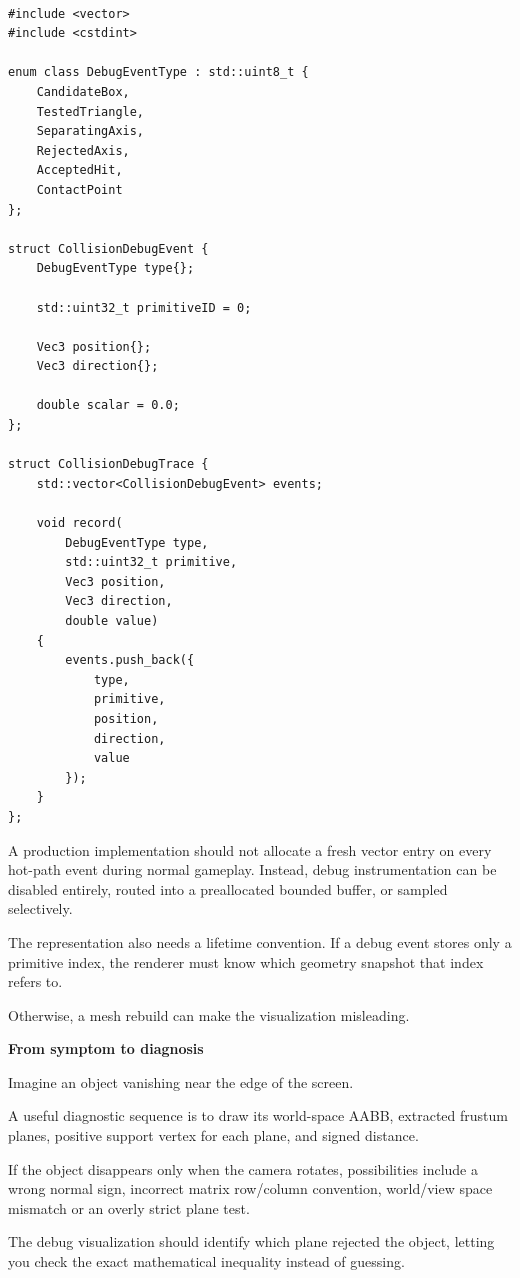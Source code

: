 \begin{verbatim}

#include <vector>
#include <cstdint>

enum class DebugEventType : std::uint8_t {
    CandidateBox,
    TestedTriangle,
    SeparatingAxis,
    RejectedAxis,
    AcceptedHit,
    ContactPoint
};

struct CollisionDebugEvent {
    DebugEventType type{};

    std::uint32_t primitiveID = 0;

    Vec3 position{};
    Vec3 direction{};

    double scalar = 0.0;
};

struct CollisionDebugTrace {
    std::vector<CollisionDebugEvent> events;

    void record(
        DebugEventType type,
        std::uint32_t primitive,
        Vec3 position,
        Vec3 direction,
        double value)
    {
        events.push_back({
            type,
            primitive,
            position,
            direction,
            value
        });
    }
};
\end{verbatim}

A production implementation should not allocate a fresh vector entry on every hot-path event during normal gameplay. Instead, debug instrumentation can be disabled entirely, routed into a preallocated bounded buffer, or sampled selectively.

The representation also needs a lifetime convention. If a debug event stores only a primitive index, the renderer must know which geometry snapshot that index refers to.

Otherwise, a mesh rebuild can make the visualization misleading.

\textbf{From symptom to diagnosis}

Imagine an object vanishing near the edge of the screen.

A useful diagnostic sequence is to draw its world-space AABB, extracted frustum planes, positive support vertex for each plane, and signed distance.

If the object disappears only when the camera rotates, possibilities include a wrong normal sign, incorrect matrix row/column convention, world/view space mismatch or an overly strict plane test.

The debug visualization should identify which plane rejected the object, letting you check the exact mathematical inequality instead of guessing.


